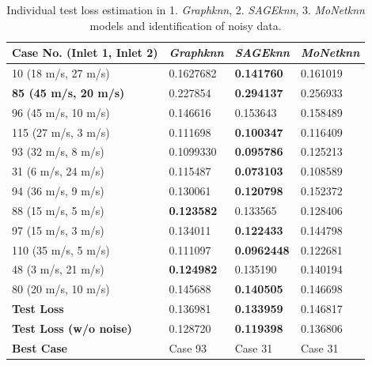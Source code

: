 \begin{table}[ht]
    \centering
    \caption{Individual test loss estimation in 1. \textit{Graphknn}, 2. \textit{SAGEknn}, 3. \textit{MoNetknn} models and identification of noisy data.}
    \label{t:}
    \begin{tabular}{|l|l|l|l|}
        \hline
        Case No. (Inlet 1, Inlet 2) & \textit{Graphknn} & \textit{SAGEknn} & \textit{MoNetknn} \\
        \hline
        10 (18 m/s, 27 m/s)& 0.1627682& \textbf{0.141760} & 0.161019\\
        \hline
        \rowcolor{red!30}\textbf{85 (45 m/s, 20 m/s)} & 0.227854 & \textbf{0.294137} & 0.256933\\
        \hline
        96 (45 m/s, 10 m/s)& 0.146616 & 0.153643 & 0.158489 \\
        \hline
        115 (27 m/s, 3 m/s)& 0.111698& \textbf{0.100347} & 0.116409 \\
        \hline
        93 (32 m/s, 8 m/s)& 0.1099330 & \textbf{0.095786} & 0.125213 \\
        \hline
        31 (6 m/s, 24 m/s) & 0.115487& \textbf{0.073103} & 0.108589 \\
        \hline
        94 (36 m/s, 9 m/s)& 0.130061 & \textbf{0.120798} & 0.152372 \\
        \hline
        88 (15 m/s, 5 m/s)& \textbf{0.123582} & 0.133565 & 0.128406 \\
        \hline
        97 (15 m/s, 3 m/s)& 0.134011 & \textbf{0.122433} & 0.144798 \\
        \hline
        110 (35 m/s, 5 m/s)& 0.111097 & \textbf{0.0962448} & 0.122681 \\
        \hline
        48 (3 m/s, 21 m/s)& \textbf{0.124982}& 0.135190 & 0.140194 \\
        \hline
        80 (20 m/s, 10 m/s)& 0.145688 & \textbf{0.140505} & 0.146698 \\
        \hline
        \textbf{Test Loss} & 0.136981 & \textbf{0.133959}& 0.146817\\
        \hline
        \textbf{Test Loss (w/o noise)} & 0.128720 & \textbf{0.119398} & 0.136806\\
        \hline
        \textbf{Best Case} & Case 93 & Case 31& Case 31\\
        \hline
    \end{tabular}
\end{table}




